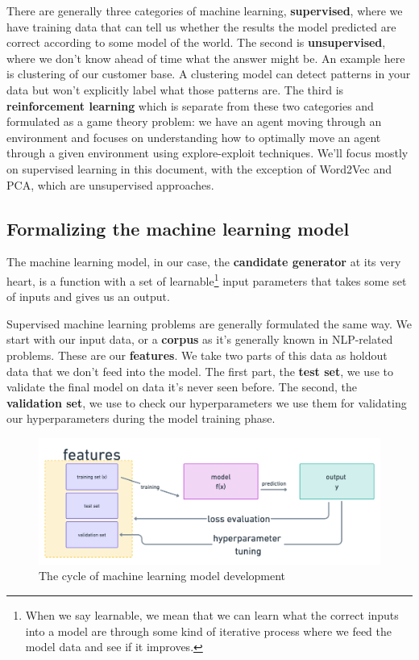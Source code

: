 \documentclass[draft, 11pt]{diazessay} %
\begin{document}
There are generally three categories of machine learning, \textbf{supervised}, where we have training data that can tell us whether the results the model predicted are correct according to some model of the world. The second is \textbf{unsupervised}, where we don't know ahead of time what the answer might be. An example here is clustering of our customer base. A clustering model can detect patterns in your data but won't explicitly label what those patterns are. The third is \textbf{reinforcement learning}  which is separate from these two categories and formulated as a game theory problem: we have an agent moving through an environment and focuses on understanding how to optimally move an agent through a given environment using explore-exploit techniques. We'll focus mostly on supervised learning in this document, with the exception of Word2Vec and PCA, which are unsupervised approaches. 

\subsection{Formalizing the machine learning model}

The machine learning model, in our case, the \textbf{candidate generator} at its very heart, is a function with a set of learnable\footnote{When we say learnable, we mean that we can learn what the correct inputs into a model are through some kind of iterative process where we feed the model data and see if it improves.} input parameters that takes some set of inputs and gives us an output. 

Supervised machine learning problems are generally formulated the same way. We start with our input data, or a \textbf{corpus} as it's generally known in NLP-related problems. These are our \textbf{features}.  We take two parts of this data as holdout data that we don't feed into the model. The first part, the \textbf{test set}, we use to validate the final model on data it's never seen before. The second, the \textbf{validation set}, we use to check our hyperparameters we use them for validating our hyperparameters during the model training phase. 

\begin{figure}[!ht]
  \includegraphics[width=\linewidth]{figures/model_cycle.png}
  \caption{The cycle of machine learning model development}
\end{figure}
\end{document}
